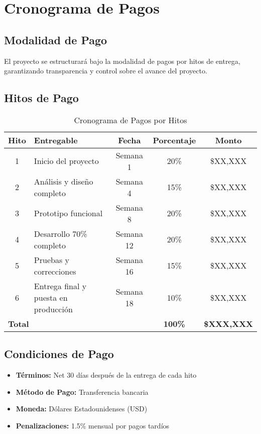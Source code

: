 \section{Cronograma de Pagos}

\subsection{Modalidad de Pago}
El proyecto se estructurará bajo la modalidad de pagos por hitos de entrega, garantizando transparencia y control sobre el avance del proyecto.

\subsection{Hitos de Pago}
\begin{table}[h!]
\centering
\begin{tabular}{|c|l|c|c|c|}
\hline
\textbf{Hito} & \textbf{Entregable} & \textbf{Fecha} & \textbf{Porcentaje} & \textbf{Monto} \\
\hline
1 & Inicio del proyecto & Semana 1 & 20\% & \$XX,XXX \\
2 & Análisis y diseño completo & Semana 4 & 15\% & \$XX,XXX \\
3 & Prototipo funcional & Semana 8 & 20\% & \$XX,XXX \\
4 & Desarrollo 70\% completo & Semana 12 & 20\% & \$XX,XXX \\
5 & Pruebas y correcciones & Semana 16 & 15\% & \$XX,XXX \\
6 & Entrega final y puesta en producción & Semana 18 & 10\% & \$XX,XXX \\
\hline
\multicolumn{3}{|l|}{\textbf{Total}} & \textbf{100\%} & \textbf{\$XXX,XXX} \\
\hline
\end{tabular}
\caption{Cronograma de Pagos por Hitos}
\end{table}

\subsection{Condiciones de Pago}
\begin{itemize}
    \item \textbf{Términos:} Net 30 días después de la entrega de cada hito
    \item \textbf{Método de Pago:} Transferencia bancaria
    \item \textbf{Moneda:} Dólares Estadounidenses (USD)
    \item \textbf{Penalizaciones:} 1.5\% mensual por pagos tardíos
\end{itemize}

